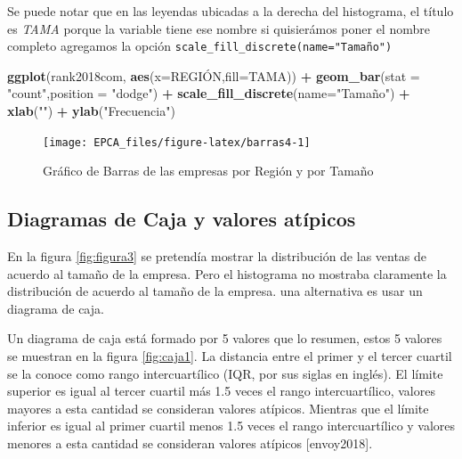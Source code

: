 \documentclass[
]{krantz}
\makeatletter
\newenvironment{Shaded}{\begin{snugshade}}{\end{snugshade}}
\newcommand{\DataTypeTok}[1]{\textcolor[rgb]{0.27,0.27,0.27}{#1}}
\newcommand{\KeywordTok}[1]{\textcolor[rgb]{0.27,0.27,0.27}{\textbf{#1}}}
\newcommand{\NormalTok}[1]{#1}
\newcommand{\OperatorTok}[1]{\textcolor[rgb]{0.43,0.43,0.43}{\textbf{#1}}}
\newcommand{\StringTok}[1]{\textcolor[rgb]{0.5,0.5,0.5}{#1}}
\newenvironment{kframe}{%
\medskip{}
\setlength{\fboxsep}{.8em}
 \def\at@end@of@kframe{}%
 \ifinner\ifhmode%
  \def\at@end@of@kframe{\end{minipage}}%
  \begin{minipage}{\columnwidth}%
 \fi\fi%
 \def\FrameCommand##1{\hskip\@totalleftmargin \hskip-\fboxsep
 \colorbox{shadecolor}{##1}\hskip-\fboxsep
     \hskip-\linewidth \hskip-\@totalleftmargin \hskip\columnwidth}%
 \MakeFramed {\advance\hsize-\width
   \@totalleftmargin\z@ \linewidth\hsize
   \@setminipage}}%
 {\par\unskip\endMakeFramed%
 \at@end@of@kframe}
\renewenvironment{Shaded}{\begin{kframe}}{\end{kframe}}
\makeatother
\begin{document}
Se puede notar que en las leyendas ubicadas a la derecha del histograma, el título es \emph{TAMA} porque la variable tiene ese nombre si quisierámos poner el nombre completo agregamos la opción \texttt{scale\_fill\_discrete(name="Tamaño")}

\begin{Shaded}
\begin{Highlighting}[]
\KeywordTok{ggplot}\NormalTok{(rank2018com, }\KeywordTok{aes}\NormalTok{(}\DataTypeTok{x=}\NormalTok{REGIÓN,}\DataTypeTok{fill=}\NormalTok{TAMA)) }\OperatorTok{+}\StringTok{ }
\StringTok{  }\KeywordTok{geom_bar}\NormalTok{(}\DataTypeTok{stat =} \StringTok{"count"}\NormalTok{,}\DataTypeTok{position =} \StringTok{"dodge"}\NormalTok{) }\OperatorTok{+}
\StringTok{  }\KeywordTok{scale_fill_discrete}\NormalTok{(}\DataTypeTok{name=}\StringTok{"Tamaño"}\NormalTok{) }\OperatorTok{+}\StringTok{ }
\StringTok{  }\KeywordTok{xlab}\NormalTok{(}\StringTok{""}\NormalTok{) }\OperatorTok{+}\StringTok{ }\KeywordTok{ylab}\NormalTok{(}\StringTok{"Frecuencia"}\NormalTok{)}
\end{Highlighting}
\end{Shaded}

\begin{figure}[h!]

{\centering \texttt{[image: EPCA\_files/figure-latex/barras4-1]} 

}

\caption{Gráfico de Barras de las empresas por Región y por Tamaño}\label{fig:barras4}
\end{figure}

\hypertarget{boxes}{%
\subsection{Diagramas de Caja y valores atípicos}\label{boxes}}

En la figura \ref{fig:figura3} se pretendía mostrar la distribución de las ventas de acuerdo al tamaño de la empresa. Pero el histograma no mostraba claramente la distribución de acuerdo al tamaño de la empresa. una alternativa es usar un diagrama de caja.

Un diagrama de caja está formado por 5 valores que lo resumen, estos 5 valores se muestran en la figura \ref{fig:caja1}. La distancia entre el primer y el tercer cuartil se la conoce como rango intercuartílico (IQR, por sus siglas en inglés). El límite superior es igual al tercer cuartil más 1.5 veces el rango intercuartílico, valores mayores a esta cantidad se consideran valores atípicos. Mientras que el límite inferior es igual al primer cuartil menos 1.5 veces el rango intercuartílico y valores menores a esta cantidad se consideran valores atípicos {[}envoy2018{]}.
\end{document}
